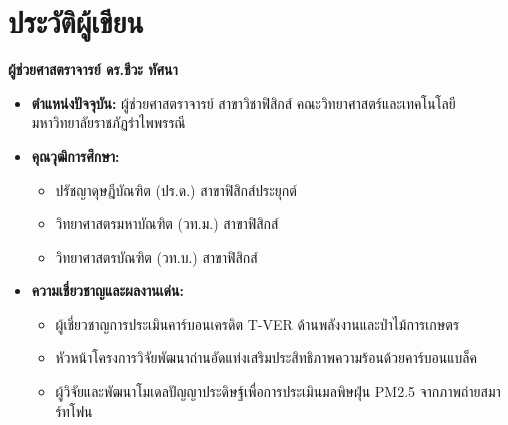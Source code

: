 \chapter{ประวัติผู้เขียน}

\begin{figure}[H]
\centering
{}
\end{figure}

\noindent\textbf{ผู้ช่วยศาสตราจารย์ ดร.ชีวะ ทัศนา}
\begin{itemize}
    \item \textbf{ตำแหน่งปัจจุบัน:} ผู้ช่วยศาสตราจารย์ สาขาวิชาฟิสิกส์ คณะวิทยาศาสตร์และเทคโนโลยี มหาวิทยาลัยราชภัฏรำไพพรรณี
    \item \textbf{คุณวุฒิการศึกษา:}
    \begin{itemize}
        \item ปรัชญาดุษฎีบัณฑิต (ปร.ด.) สาขาฟิสิกส์ประยุกต์
        \item วิทยาศาสตรมหาบัณฑิต (วท.ม.) สาขาฟิสิกส์
        \item วิทยาศาสตรบัณฑิต (วท.บ.) สาขาฟิสิกส์
    \end{itemize}
    \item \textbf{ความเชี่ยวชาญและผลงานเด่น:}
    \begin{itemize}
        \item ผู้เชี่ยวชาญการประเมินคาร์บอนเครดิต T-VER ด้านพลังงานและป่าไม้การเกษตร
        \item หัวหน้าโครงการวิจัยพัฒนาถ่านอัดแท่งเสริมประสิทธิภาพความร้อนด้วยคาร์บอนแบล็ค
        \item ผู้วิจัยและพัฒนาโมเดลปัญญาประดิษฐ์เพื่อการประเมินมลพิษฝุ่น PM2.5 จากภาพถ่ายสมาร์ทโฟน
    \end{itemize}
\end{itemize}

